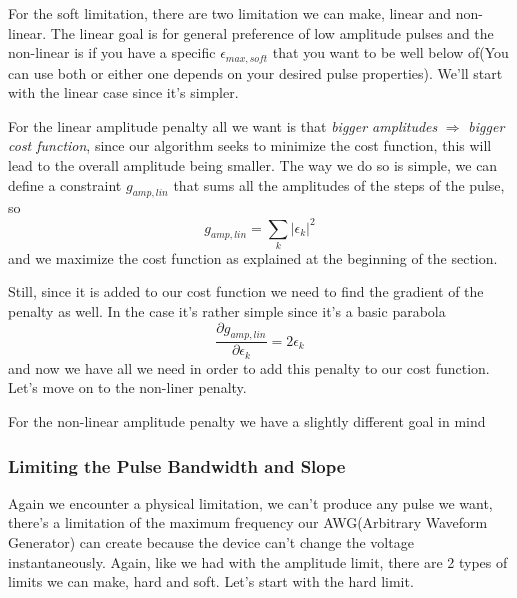 \documentclass[english, a4paper, 12pt, twoside]{article}
\numberwithin{equation}{section} %
\begin{document}
For the soft limitation, there are two limitation we can make, linear and non-linear. The linear goal is for general preference of low amplitude pulses and the non-linear is if you have a specific \(\epsilon_{max,soft}\) that you want to be well below of(You can use both or either one depends on your desired pulse properties). We'll start with the linear case since it's simpler.

For the linear amplitude penalty all we want is that \textit{bigger amplitudes} \(\Rightarrow\) \textit{bigger cost function}, since our algorithm seeks to minimize the cost function, this will lead to the overall amplitude being smaller. The way we do so is simple, we can define a constraint \(g_{amp,lin}\) that sums all the amplitudes of the steps of the pulse, so
\[
    g_{amp,lin} = \sum_k |\epsilon_k|^2
\]
and we maximize the cost function as explained at the beginning of the section.

Still, since it is added to our cost function we need to find the gradient of the penalty as well. In the case it's rather simple since it's a basic parabola
\[
    \frac{\partial g_{amp,lin}}{\partial \epsilon_k} = 2\epsilon_k
\]
and now we have all we need in order to add this penalty to our cost function. Let's move on to the non-liner penalty.

For the non-linear amplitude penalty we have a slightly different goal in mind


\subsubsection{Limiting the Pulse Bandwidth and Slope}
Again we encounter a physical limitation, we can't produce any pulse we want, there's a limitation of the maximum frequency our AWG(Arbitrary Waveform Generator) can create because the device can't change the voltage instantaneously. Again, like we had with the amplitude limit, there are 2 types of limits we can make, hard and soft. Let's start with the hard limit.
\end{document}
